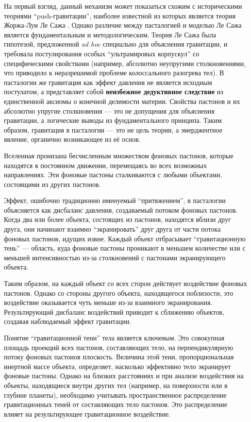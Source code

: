 \documentclass[pdflatex,sn-mathphys-num]{sn-jnl}
\begin{document}
На первый взгляд, данный механизм может показаться схожим с историческими теориями ``push-гравитации'', наиболее известной из которых является теория Жоржа-Луи Ле Сажа \cite{lesage-edwards2014}. Однако различие между пасталогией и моделью Ле Сажа является фундаментальным и методологическим. Теория Ле Сажа была гипотезой, предложенной \textit{ad hoc} специально для объяснения гравитации, и требовала постулирования особых ``ультрамировых корпускул'' со специфическими свойствами (например, абсолютно неупругими столкновениями, что приводило к неразрешимой проблеме колоссального разогрева тел). В пасталогии же гравитация как эффект давления не является исходным постулатом, а представляет собой \textbf{неизбежное дедуктивное следствие} из единственной аксиомы о конечной делимости материи. Свойства пастонов и их абсолютно упругие столкновения --- это не допущения для объяснения гравитации, а логические выводы из фундаментального принципа. Таким образом, гравитация в пасталогии --- это не цель теории, а эмерджентное явление, органично возникающее из её основ.

Вселенная пронизана бесчисленным множеством фоновых пастонов, которые находятся в постоянном движении, перемещаясь во всех возможных направлениях. Эти фоновые пастоны сталкиваются с любыми объектами, состоящими из других пастонов.

Эффект, ошибочно традиционно именуемый ``притяжением'', в пасталогии объясняется как дисбаланс давления, создаваемый потоком фоновых пастонов. Когда два или более объекта, состоящих из пастонов, находятся вблизи друг друга, они начинают взаимно ``экранировать'' друг друга от части потока фоновых пастонов, идущих извне. Каждый объект отбрасывает ``гравитационную тень'' --- область, куда фоновые пастоны проникают в меньшем количестве или с меньшей интенсивностью из-за столкновений с пастонами экранирующего объекта.

Таким образом, на каждый объект со всех сторон действует воздействие фоновых пастонов. Однако со стороны другого объекта, находящегося поблизости, это воздействие оказывается чуть меньше из-за взаимного экранирования. Результирующий дисбаланс воздействий приводит к сближению объектов, создавая наблюдаемый эффект гравитации.

Понятие ``гравитационной тени'' тела является ключевым. Это совокупная площадь проекций всех пастонов, составляющих тело, на перпендикулярную потоку фоновых пастонов плоскость. Величина этой тени, пропорциональная инертной массе объекта, определяет, насколько эффективно тело экранирует фоновые пастоны. Однако на близких расстояниях и при анализе воздействия на объекты, находящиеся внутри других тел (например, на поверхности или в глубине планеты), необходимо учитывать пространственное распределение гравитационных теней от составляющих тело пастонов. Это распределение влияет на результирующее гравитационное воздействие.
\end{document}
